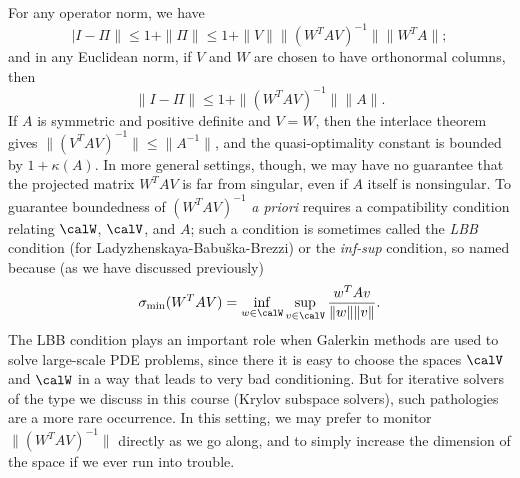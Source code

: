 For any operator norm, we have
\[
  |I-\Pi\| \leq 1+\|\Pi\| \leq 1 + \|V\| \|(W^T A V)^{-1}\| \|W^T A\|;
\]
and in any Euclidean norm, if $V$ and $W$ are chosen to have orthonormal
columns, then
\[
  \|I-\Pi\| \leq 1 + \|(W^T A V)^{-1}\| \|A\|.
\]
If $A$ is symmetric and positive definite and $V = W$, then the
interlace theorem gives $\|(V^T A V)^{-1}\| \leq \|A^{-1}\|$,
and the quasi-optimality constant is bounded by $1 + \kappa(A)$.
In more general settings, though, we may have no guarantee that
the projected matrix $W^T A V$ is far from singular, even if $A$
itself is nonsingular.  To guarantee boundedness of $(W^T A V)^{-1}$
{\em a priori} requires a compatibility condition relating
$\calW$, $\calV$, and $A$; such a condition is sometimes called
the {\em LBB} condition
(for Ladyzhenskaya-Babu\v{s}ka-Brezzi) or
the {\em inf-sup} condition, so named because (as we have discussed
previously)
\[
  \sigma_{\min}(W^T A V) =
  \inf_{w \in \calW} \sup_{v \in \calV} \frac{w^T A v}{\|w\| \|v\|}.
\]
The LBB condition plays an important role when Galerkin methods are
used to solve large-scale PDE problems, since there it is easy to
choose the spaces $\calV$ and $\calW$ in a way that leads to very
bad conditioning.  But for iterative solvers of the type we discuss
in this course (Krylov subspace solvers), such pathologies are a more
rare occurrence.  In this setting, we may prefer to
monitor $\|(W^T A V)^{-1}\|$ directly as we go along, and to simply
increase the dimension of the space if we ever run into trouble.
